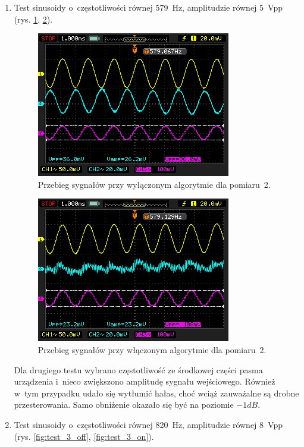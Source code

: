 \begin{enumerate}
	\item Test sinusoidy o~częstotliwości równej \SI{579}{\Hz}, amplitudzie równej 5~Vpp (rys. \ref{fig:test_2_off}, \ref{fig:test_2_on}).\\
	\begin{figure}[h!]
		\centering
		\includegraphics[scale=0.7]{../Assets/Results/2_579_5_off.png}
		\caption{Przebieg sygnałów przy wyłączonym algorytmie dla pomiaru~2.}
		\label{fig:test_2_off}
	\end{figure}
	\begin{figure}[h!]
		\centering
		\includegraphics[scale=0.7]{../Assets/Results/2_579_5_on.png}
		\caption{Przebieg sygnałów przy włączonym algorytmie dla pomiaru~2.}
		\label{fig:test_2_on}
	\end{figure}
	Dla drugiego testu wybrano częstotliwość ze środkowej części pasma urządzenia i~nieco zwiększono amplitudę sygnału wejściowego. Również w~tym przypadku udało się wytłumić hałas, choć wciąż zauważalne są drobne przesterowania. Samo obniżenie okazało się być na poziomie $-1 dB$.
	\item Test sinusoidy o~częstotliwości równej \SI{820}{\Hz}, amplitudzie równej 8~Vpp (rys. \ref{fig:test_3_off}, \ref{fig:test_3_on}).\\
	\begin{figure}[h!]
		\centering

\end{figure}
\end{enumerate}
